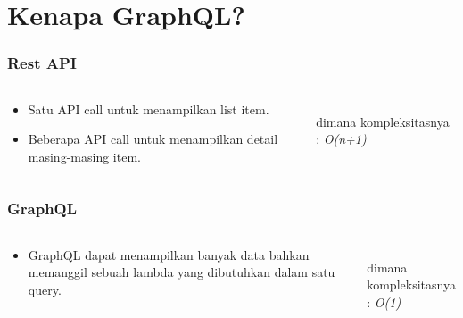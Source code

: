 \documentclass[12pt,xcolor=table]{beamer}
\begin{document}
\section{Kenapa GraphQL?}

\begin{frame}
\frametitle{Rest API}
\begin{columns}
\begin{column}{0.5\textwidth}
    \begin{itemize}
        \item Satu API call untuk menampilkan list item.
        \item Beberapa API call untuk menampilkan detail masing-masing item.
    \end{itemize}
\end{column}
\begin{column}{0.5\textwidth}  %
    \inputminted{bash}{code/rest.text}
    dimana kompleksitasnya : \textit{O(n+1)}
\end{column}
\end{columns}
\end{frame}

\begin{frame}
\frametitle{GraphQL}
\begin{columns}
\begin{column}{0.5\textwidth}
    \begin{itemize}
        \item GraphQL dapat menampilkan banyak data bahkan memanggil sebuah lambda yang dibutuhkan dalam satu query.
    \end{itemize}
\end{column}
\begin{column}{0.5\textwidth}  %
    \inputminted{bash}{code/graphql.text}
    dimana kompleksitasnya : \textit{O(1)}
\end{column}
\end{columns}
\end{frame}
\end{document}
